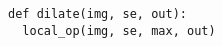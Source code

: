 \documentclass[varwidth=4cm, border={0.1cm 0.1cm 0.1cm 0.1cm}]{standalone}
\begin{document}
\begin{verbatim}
def dilate(img, se, out):
  local_op(img, se, max, out)
\end{verbatim}
\end{document}
